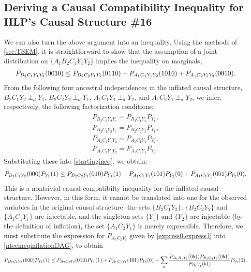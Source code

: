 \documentclass[aps,english,10pt,superscriptaddress,onecolumn,twoside,longbibliography,pra,floatfix,fleqn,nofootinbib]{revtex4-1}
\theoremstyle{definition}
\newcommand{\p}[2][]{{P_{#1}}\parenths{#2}}
\DeclarePairedDelimiter{\parenths}{\lparen}{\rparen}
\begin{document}
\subsection{Deriving a Causal Compatibility Inequality for HLP's Causal Structure \#16}

We can also turn the above argument into an inequality. Using the methods of \cref{sec:TSEM}, it is straightforward to show that the assumption of a joint distribution on $\{ A_1 B_2 C_1 Y_1 Y_2\}$ implies the inequality on marginals,
\begin{align}\label{startingineq}
    \p[B_2 C_1Y_1 Y_2]{0010} \leq \p[B_2 C_2Y_1 Y_2]{0110} + \p[A_1 C_1 Y_1 Y_2]{10 10}+\p[A_1 C_2 Y_1 Y_2]{0010}.
\end{align}
From the following four ancestral independences in the inflated causal structure, $B_2 C_1  Y_2 \perp_d Y_1$, $B_2 C_2 Y_2 \perp_d Y_1$, $A_1 C_1 Y_1 \perp_d Y_2$, and $A_1 C_2 Y_1 \perp_d Y_2$, we infer, respectively, the following factorization conditions:
\begin{align}
\begin{split}
P_{B_2 C_1  Y_2 Y_1}=P_{B_2 C_1  Y_2}P_{Y_1},\\
P_{B_2 C_2 Y_2 Y_1}=P_{B_2 C_2  Y_2}P_{Y_1},\\
P_{A_1 C_1 Y_1  Y_2}=P_{A_1 C_1 Y_1 }P_{Y_2},\\
P_{A_1 C_2 Y_1  Y_2}=P_{A_1 C_2 Y_1 }P_{Y_2}.
\end{split}
\end{align}
Substituting these into \cref{startingineq}, we obtain:
\begin{align}\label{ntccineqinflationDAG}
    \p[B_2 C_1Y_2 ]{000}\p[Y_1]{1} \leq \p[B_2 C_2Y_2]{010} \p[ Y_1]{1} + \p[A_1 C_1 Y_1 ]{10 1}\p[Y_2]{0}+\p[A_1 C_2 Y_1]{001}\p[ Y_2]{0}.
\end{align}
This is a nontrivial causal compatibilty inequality for the inflated causal structure. However, in this form, it cannot be translated into one for the observed variables in the original causal structure: the sets $\{B_2 C_1 Y_2 \}$, $\{ B_2 C_2 Y_2\}$ and $\{ A_1 C_1 Y_1\}$ are injectable, and the singleton sets $\{ Y_1\} $ and $\{Y_2\}$ are injectable (by the definition of inflation), the set $\{ A_1 C_2 Y_1 \}$ is merely expressible.  Therefore, we must substitute the expression for $P_{A_1 C_2 Y_1}$ given by \cref{express0,express1} into \cref{ntccineqinflationDAG}, to obtain
\begin{align}\label{ntccineqinflationDAG2}
    \p[B_2 C_1Y_2 ]{000}\p[Y_1]{1} \leq \p[B_2 C_2 Y_2]{010} \p[ Y_1]{1} + \p[A_1 C_1 Y_1 ]{10 1}\p[Y_2]{0}+\sum_{b} \frac{P_{A_1 B_1 Y_1}(0 b 1) P_{B_1 C_2  Y_1}(0 b 1) }{P_{B_1 Y_1}(b 1)}  \p[ Y_2]{0}.
\end{align}
\end{document}
